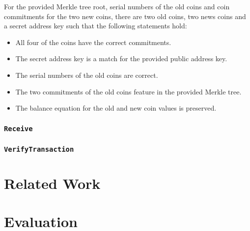 \documentclass{article}
\begin{document}
For the provided Merkle tree root, serial numbers of the old coins and coin commitments for the two new coins, there are two old coins, two news coins and a secret address key such that the following statements hold:

\begin{itemize}
\item All four of the coins have the correct commitments.
\item The secret address key is a match for the provided public address key.
\item The serial numbers of the old coins are correct.
\item The two commitments of the old coins feature in the provided Merkle tree.
\item The balance equation for the old and new coin values is preserved.
\end{itemize}

\subsubsection{\texttt{Receive}}
\subsubsection{\texttt{VerifyTransaction}}

\section{Related Work}
\section{Evaluation}

\newpage
\printbibliography
\end{document}

